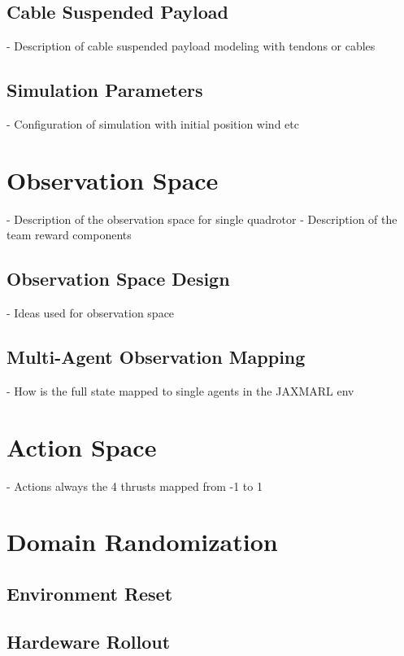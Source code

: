\subsection{Cable Suspended Payload}
- Description of cable suspended payload modeling with tendons or cables
\subsection{Simulation Parameters}
- Configuration of simulation with initial position wind etc

\section{Observation Space}
- Description of the observation space for single quadrotor
- Description of the team reward components
\subsection{Observation Space Design}
- Ideas used for observation space
\subsection{Multi-Agent Observation Mapping}
- How is the full state mapped to single agents in the JAXMARL env

\section{Action Space}
- Actions always the 4 thrusts mapped from -1 to 1

\section{Domain Randomization}
\subsection{Environment Reset}

\subsection{Hardeware Rollout}

